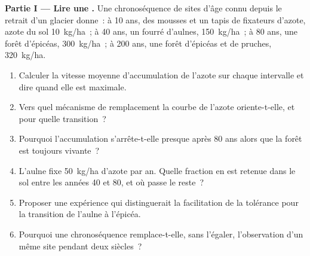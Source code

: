 \begin{problem}
\label{pb:b1:ecosystem-dynamics:1}

\medskip
\noindent\textbf{Partie I --- Lire une .}
Une chronoséquence de sites d'âge connu depuis le retrait d'un glacier
donne~: à 10 ans, des mousses et un tapis de fixateurs d'azote, azote du
sol \qty{10}{kg/ha}~; à 40 ans, un fourré d'aulnes, \qty{150}{kg/ha}~;
à 80 ans, une forêt d'épicéas, \qty{300}{kg/ha}~; à 200 ans, une forêt
d'épicéas et de pruches, \qty{320}{kg/ha}.
\begin{enumerate}
  \item Calculer la vitesse moyenne d'accumulation de l'azote sur
        chaque intervalle et dire quand elle est maximale.
  \item Vers quel mécanisme de remplacement la courbe de l'azote
        oriente-t-elle, et pour quelle transition~?
  \item Pourquoi l'accumulation s'arrête-t-elle presque après 80 ans
        alors que la forêt est toujours vivante~?
  \item L'aulne fixe \qty{50}{kg/ha} d'azote par an. Quelle fraction en
        est retenue dans le sol entre les années 40 et 80, et où passe
        le reste~?
  \item Proposer une expérience qui distinguerait la facilitation de
        la tolérance pour la transition de l'aulne à l'épicéa.
  \item Pourquoi une chronoséquence remplace-t-elle, sans l'égaler,
        l'observation d'un même site pendant deux siècles~?
\end{enumerate}


\end{problem}
